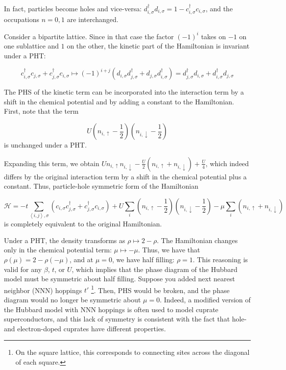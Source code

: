 In fact, particles become holes and vice-versa: $d_{ i, \sigma}^\dagger d_{ i, \sigma} = 1 - c_{ i, \sigma}^\dagger c_{ i, \sigma} $, and the occupations $n = 0, 1$ are interchanged.

Consider a bipartite lattice. Since in that case the factor $(-1)^i$ takes on $-1$ on one sublattice and $1$ on the other, the kinetic part of the Hamiltonian is invariant under a PHT:

\begin{equation}
c_{i, \sigma}^\dagger c_{j, \sigma} + c_{j, \sigma}^\dagger c_{i, \sigma} \mapsto (-1)^{i+j} ( d_{i, \sigma} d_{j, \sigma}^\dagger + d_{j, \sigma} d_{i, \sigma}^\dagger ) = d_{j, \sigma}^\dagger d_{i, \sigma} + d_{i, \sigma}^\dagger d_{j, \sigma}
\end{equation}

The PHS of the kinetic term can be incorporated into the interaction term by a shift in the chemical potential and by adding a constant to the Hamiltonian. First, note that the term

\begin{equation*}
U ( n_{i,\uparrow} - \frac{1}{2} ) ( n_{i,\downarrow} - \frac{1}{2} )
\end{equation*}
is unchanged under a PHT.

Expanding this term, we obtain $U n_{i,\uparrow} n_{i,\downarrow} - \frac{U}{2} (n_{i,\uparrow} + n_{i,\downarrow}) + \frac{U}{4}$, which indeed differs by the original interaction term by a shift in the chemical potential plus a constant. Thus,  particle-hole symmetric form of the Hamiltonian 

\begin{equation}
\mathcal{H} = -t \sum_{\left\langle i, j \right \rangle, \sigma} ( c_{i,\sigma} c_{j,\sigma}^\dagger + c_{j,\sigma}^\dagger c_{i,\sigma} ) + U \sum_{i} ( n_{i,\uparrow} - \frac{1}{2} ) ( n_{i,\downarrow} - \frac{1}{2} ) -\mu \sum_i ( n_{i,\uparrow} + n_{i,\downarrow} )
\end{equation}
is completely equivalent to the original Hamiltonian.

Under a PHT, the density transforms as $\rho \mapsto 2 - \rho$. The Hamiltonian changes only in the chemical potential term: $\mu \mapsto -\mu$. Thus, we have that $\rho (\mu) = 2 - \rho (-\mu)$, and at $\mu = 0$, we have half filling: $\rho = 1$. This reasoning is valid for any $\beta$, $t$, or $U$, which implies that the phase diagram of the Hubbard model must be symmetric about half filling. Suppose you added next nearest neighbor (NNN) hoppings $t'$ \footnote{On the square lattice, this corresponds to connecting sites across the diagonal of each square.}. Then, PHS would be broken, and the phase diagram would no longer be symmetric about $\mu = 0$. Indeed, a modified version of the Hubbard model with NNN hoppings is often used to model cuprate superconductors, and this lack of symmetry is consistent with the fact that hole- and electron-doped cuprates have different properties. 